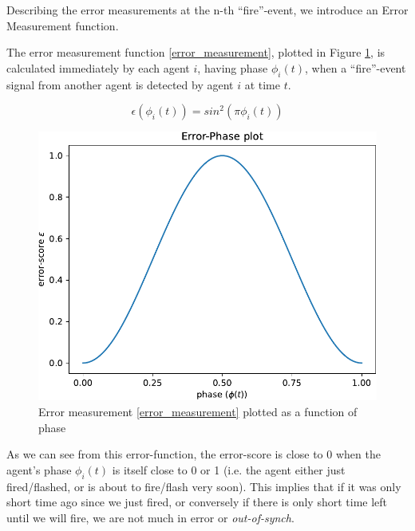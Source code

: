 	Describing the error measurements at the n-th ``fire''-event, we introduce an Error Measurement function.

	The error measurement function \eqref{error_measurement}, plotted in Figure \ref{fig:error_measurement}, is calculated immediately by each agent $i$, having phase $\phi_i(t)$, when a ``fire''-event signal from another agent is detected by agent $i$ at time $t$.

	\begin{equation}
	\label{error_measurement}
		\epsilon(\phi_i(t)) = sin^2(\pi\phi_i(t))
	\end{equation} \nl

	\begin{figure}[ht!]
		\centering
		\includegraphics[width=0.65\linewidth]{Assets/DocSegments/Chapters/Baseline/Figures/Functions/PhaseErrorFunction.pdf}
		\caption[Plot of error-measurement function for K. Nymoen's frequency-adjustment]{Error measurement \eqref{error_measurement} plotted as a function of phase}
		\label{fig:error_measurement}
	\end{figure}

	As we can see from this error-function, the error-score is close to 0 when the agent's phase $\phi_i(t)$ is itself close to 0 or 1 (i.e. the agent either just fired/flashed, or is about to fire/flash very soon). This implies that if it was only short time ago since we just fired, or conversely if there is only short time left until we will fire, we are not much in error or \textit{out-of-synch}. 

